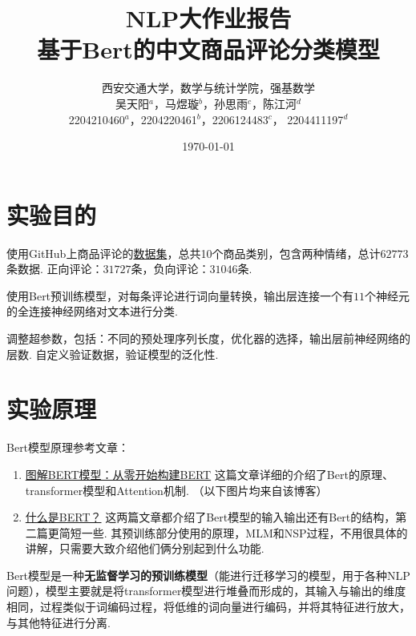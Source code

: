 \documentclass[12pt, a4paper, oneside]{ctexart}
\numberwithin{equation}{section}  %
\begin{document}
\title{NLP大作业报告\\基于Bert的中文商品评论分类模型}
\author{
西安交通大学，数学与统计学院，强基数学\\[3ex]
吴天阳$^a$，马煜璇$^b$，孙思雨$^c$，陈江河$^d$\\[1ex]
2204210460$^a$，2204220461$^b$，2206124483$^c$， 2204411197$^d$\\[2ex]
}
\date{\today}
\maketitle %
\clearpage %
\tableofcontents %

\clearpage
\section{实验目的}
使用GitHub上商品评论的\href{https://github.com/SophonPlus/ChineseNlpCorpus/blob/master/datasets/online_shopping_10_cats/intro.ipynb}{数据集}，总共10个商品类别，包含两种情绪，总计$62773$条数据. 正向评论：$31727$条，负向评论：$31046$条.

使用Bert预训练模型，对每条评论进行词向量转换，输出层连接一个有$11$个神经元的全连接神经网络对文本进行分类.

调整超参数，包括：不同的预处理序列长度，优化器的选择，输出层前神经网络的层数. 自定义验证数据，验证模型的泛化性.
\section{实验原理}
Bert模型原理参考文章：

\begin{enumerate}
\def\labelenumi{\arabic{enumi}.}
\item
  \href{https://cloud.tencent.com/developer/article/1389555}{图解BERT模型：从零开始构建BERT}
  这篇文章详细的介绍了Bert的原理、transformer模型和Attention机制.
  （以下图片均来自该博客）
\item
  \href{https://zhuanlan.zhihu.com/p/98855346}{什么是BERT？}
  这两篇文章都介绍了Bert模型的输入输出还有Bert的结构，第二篇更简短一些.
  其预训练部分使用的原理，MLM和NSP过程，不用很具体的讲解，只需要大致介绍他们俩分别起到什么功能.
\end{enumerate}

Bert模型是一种\textbf{无监督学习的预训练模型}（能进行迁移学习的模型，用于各种NLP问题），模型主要就是将transformer模型进行堆叠而形成的，其输入与输出的维度相同，过程类似于词编码过程，将低维的词向量进行编码，并将其特征进行放大，与其他特征进行分离.
\end{document}
